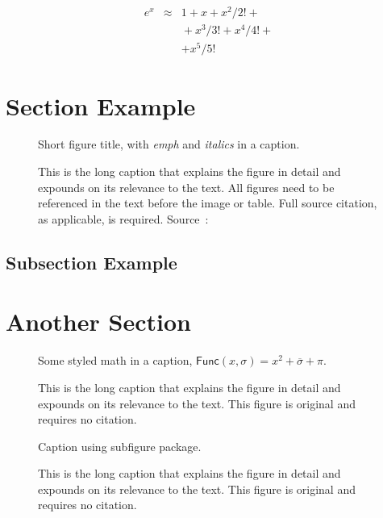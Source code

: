 \lipsum*[65]
\begin{eqnarray}
 e^x &\approx& 1+x+x^2/2! + \\
   && {}+x^3/3! + x^4/4! + \\
   && + x^5/5!
\end{eqnarray}

\section{Section Example}
\lipsum[47]

\begin{figure}[!htb]
\framebox[\textwidth]{\parbox{\textwidth}{\lipsum[65]}}
\caption{Short figure title, with \emph{emph} and \textit{italics} in a caption.}
\caption*{\small This is the long caption that explains the figure in detail and
expounds on its relevance to the text.
All figures need to be referenced in the text before the image or table.
Full source citation, as applicable, is required.
Source~\cite{IEEEexample:bibtexguide}: }
\end{figure}

\subsection{Subsection Example}
\lipsum[56]

\section{Another Section}
\lipsum[55-56]

\begin{figure}[!htb]
\framebox[\textwidth]{\parbox{\textwidth}{\lipsum[65]}}
\caption{Some styled math in a caption, $\mathsf{Func}(x, \sigma) = x^2 + \overline{\sigma} + \pi$.}
\caption*{\small This is the long caption that explains the figure in detail
and expounds on its relevance to the text.
This figure is original and requires no citation.}
\end{figure}

\begin{figure}[!htb]
\centering
{}
\hfill
{}
\caption{Caption using subfigure package.}
\caption*{\small This is the long caption that explains the figure in detail
and expounds on its relevance to the text.
This figure is original and requires no citation.}
\end{figure}


